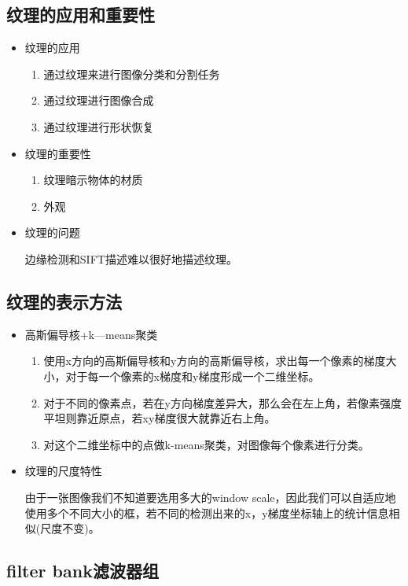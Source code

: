 \documentclass[UTF8]{ctexart}
\begin{document}
\subsection{纹理的应用和重要性}
\begin{itemize}
    \item 纹理的应用
    \begin{enumerate}
        \item 通过纹理来进行图像分类和分割任务
        \item 通过纹理进行图像合成
        \item 通过纹理进行形状恢复
    \end{enumerate}
    \item 纹理的重要性
    \begin{enumerate}
        \item 纹理暗示物体的材质
        \item 外观
    \end{enumerate}
    \item 纹理的问题
    
    边缘检测和SIFT描述难以很好地描述纹理。


\end{itemize}

\subsection{纹理的表示方法}
\begin{itemize}
    \item 高斯偏导核+k—means聚类
    \begin{enumerate}
        \item 使用x方向的高斯偏导核和y方向的高斯偏导核，求出每一个像素的梯度大小，对于每一个像素的x梯度和y梯度形成一个二维坐标。
        \item 对于不同的像素点，若在y方向梯度差异大，那么会在左上角，若像素强度平坦则靠近原点，若xy梯度很大就靠近右上角。
        \item 对这个二维坐标中的点做k-means聚类，对图像每个像素进行分类。
    \end{enumerate}
    \item 纹理的尺度特性
    
    由于一张图像我们不知道要选用多大的window scale，因此我们可以自适应地使用多个不同大小的框，若不同的检测出来的x，y梯度坐标轴上的统计信息相似(尺度不变)。
\end{itemize}

\subsection{filter bank滤波器组}
\end{document}
